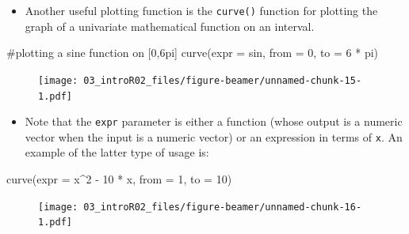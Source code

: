 \documentclass[
  9pt,
  a4paper,
  ignorenonframetext,
  notheorems]{beamer}
\newenvironment{Shaded}{\begin{snugshade}}{\end{snugshade}}
\newcommand{\AttributeTok}[1]{\textcolor[rgb]{0.40,0.45,0.13}{#1}}
\newcommand{\CommentTok}[1]{\textcolor[rgb]{0.37,0.37,0.37}{#1}}
\newcommand{\DecValTok}[1]{\textcolor[rgb]{0.68,0.00,0.00}{#1}}
\newcommand{\FunctionTok}[1]{\textcolor[rgb]{0.28,0.35,0.67}{#1}}
\newcommand{\NormalTok}[1]{\textcolor[rgb]{0.00,0.23,0.31}{#1}}
\newcommand{\SpecialCharTok}[1]{\textcolor[rgb]{0.37,0.37,0.37}{#1}}
\providecommand{\tightlist}{%
  \setlength{\itemsep}{0pt}\setlength{\parskip}{0pt}}\usepackage{longtable,booktabs,array}
\begin{document}
\begin{frame}[fragile]
\begin{itemize}
\tightlist
\item
  Another useful plotting function is the \texttt{curve()} function for
  plotting the graph of a univariate mathematical function on an
  interval.
\end{itemize}

\begin{Shaded}
\begin{Highlighting}[]
\CommentTok{\#plotting a sine function on [0,6pi]}
\FunctionTok{curve}\NormalTok{(}\AttributeTok{expr =}\NormalTok{ sin, }\AttributeTok{from =} \DecValTok{0}\NormalTok{, }\AttributeTok{to =} \DecValTok{6} \SpecialCharTok{*}\NormalTok{ pi)}
\end{Highlighting}
\end{Shaded}

\begin{figure}

{\centering \texttt{[image: 03\_introR02\_files/figure-beamer/unnamed-chunk-15-1.pdf]}

}

\end{figure}
\end{frame}

\begin{frame}[fragile]
\begin{itemize}
\tightlist
\item
  Note that the \texttt{expr} parameter is either a function (whose
  output is a numeric vector when the input is a numeric vector) or an
  expression in terms of \texttt{x}. An example of the latter type of
  usage is:
\end{itemize}

\begin{Shaded}
\begin{Highlighting}[]
\FunctionTok{curve}\NormalTok{(}\AttributeTok{expr =}\NormalTok{ x}\SpecialCharTok{\^{}}\DecValTok{2} \SpecialCharTok{{-}} \DecValTok{10} \SpecialCharTok{*}\NormalTok{ x, }\AttributeTok{from =} \DecValTok{1}\NormalTok{, }\AttributeTok{to =} \DecValTok{10}\NormalTok{)}
\end{Highlighting}
\end{Shaded}

\begin{figure}

{\centering \texttt{[image: 03\_introR02\_files/figure-beamer/unnamed-chunk-16-1.pdf]}

}

\end{figure}
\end{frame}
\end{document}
